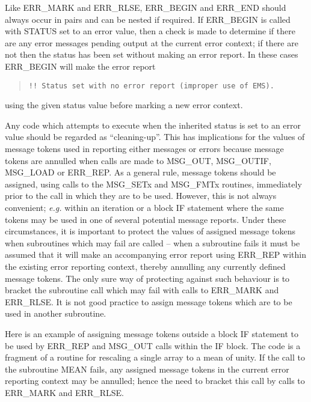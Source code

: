Like ERR\_MARK and ERR\_RLSE, ERR\_BEGIN and ERR\_END should always occur in
pairs and can be nested if required.
If ERR\_BEGIN is called with STATUS set to an error value, then a check is 
made to determine if there are any error messages pending output at the 
current error context; if there are not then the status has been set without 
making an error report.
In these cases ERR\_BEGIN will make the error report

\begin {quote}
\begin {small}
\begin{verbatim}
!! Status set with no error report (improper use of EMS).
\end{verbatim}
\end {small}
\end{quote}

using the given status value before marking a new error context.

Any code which attempts to execute when the inherited status is set to an error
value should be regarded as ``cleaning-up''.
This has implications for the values of message tokens used in reporting either
messages or errors because message tokens are annulled when calls are made to
MSG\_OUT, MSG\_OUTIF, MSG\_LOAD or ERR\_REP.
As a general rule, message tokens should be assigned, using calls to the
MSG\_SETx and MSG\_FMTx routines, immediately prior to the call 
in which they are to be used.
However, this is not always convenient; {\em e.g.} within an iteration 
or a block IF statement where the same tokens may be used in one of several
potential message reports.
Under these circumstances, it is important to protect the values of assigned
message tokens when subroutines which may fail are called -- when a subroutine
fails it must be assumed that it will make an accompanying error report
using ERR\_REP within the existing error reporting context, thereby annulling
any currently defined message tokens.
The only sure way of protecting against such behaviour is to bracket the 
subroutine call which may fail with calls to ERR\_MARK and ERR\_RLSE.
It is not good practice to assign message tokens which are to be used in
another subroutine.

Here is an example of assigning message tokens outside a block IF statement
to be used by ERR\_REP and MSG\_OUT calls within the IF block. 
The code is a fragment of a routine for rescaling a single array to a mean 
of unity.
If the call to the subroutine MEAN fails, any assigned message tokens in the 
current error reporting context may be annulled; hence the need to bracket this
call by calls to ERR\_MARK and ERR\_RLSE.

